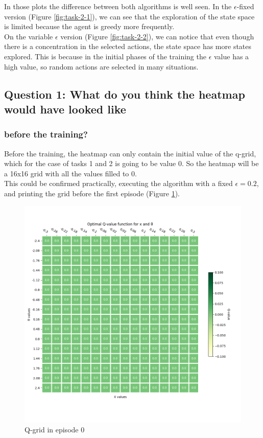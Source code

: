 \documentclass[12pt]{article}
\begin{document}
In those plots the difference between both algorithms is well seen. In the $\epsilon$-fixed version (Figure \ref{fig:task-2-1}), we can see that the exploration of the state space is limited because the agent is greedy more frequently.\\

On the variable $\epsilon$ version (Figure \ref{fig:task-2-2}), we can notice that even though there is a concentration in the selected actions, the state space has more states explored. This is because in the initial phases of the training the $\epsilon$ value has a high value, so random actions are selected in many situations.

\subsection{Question 1: What do you think the heatmap would have looked like}

\subsubsection{before the training?}

Before the training, the heatmap can only contain the initial value of the q-grid, which for the case of tasks 1 and 2 is going to be value 0. So the heatmap will be a 16x16 grid with all the values filled to 0. \\

This could be confirmed practically, executing the algorithm with a fixed $\epsilon = 0.2$, and printing the grid before the first episode (Figure \ref{fig:q-1-1}).

\begin{figure}[h]
    \centering
    \includegraphics[scale=0.25]{exercise-3/plots/heatmap-fixed-0.2-ep-0.png}
    \caption{Q-grid in episode 0}
    \label{fig:q-1-1}
\end{figure}
\end{document}
